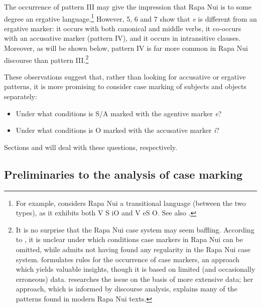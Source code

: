 The occurrence of pattern III may give the impression that Rapa Nui is to some degree an ergative language.\footnote{\label{fn:386}For example, \citet[296]{Otsuka2011} considers Rapa Nui a transitional language (between the two types), as it exhibits both V S iO and V eS O. See also \citet[182]{Mosel1997}.} However, 5, 6 and 7 show that \textit{e} is different from an ergative marker: it occurs with both canonical and middle verbs, it co\nobreakdash-occurs with an accusative marker (pattern IV), and it occurs in intransitive clauses. Moreover, as will be shown below, pattern IV is far more common in Rapa Nui discourse than pattern III.\footnote{\label{fn:387}It is no surprise that the Rapa Nui case system may seem baffling. According to \citet[575]{Clark1973}, it is unclear under which conditions case markers in Rapa Nui can be omitted, while \citet[168]{Chapin1978} admits not having found any regularity in the Rapa Nui case system. \citet{Alexander1981OL,Alexander1981Minnesota} formulates rules for the occurrence of case markers, an approach which yields valuable insights, though it is based on limited (and occasionally erroneous) data. \citet{WeberN1988,WeberN2003} researches the issue on the basis of more extensive data; her approach, which is informed by discourse analysis, explains many of the patterns found in modern Rapa Nui texts.}

These observations suggest that, rather than looking for accusative or ergative patterns, it is more promising to consider case marking of subjects and objects separately: 

\begin{itemize}
\item 
Under what conditions is S/A marked with the agentive marker \textit{e}?

\item 
Under what conditions is O marked with the accusative marker \textit{i}? 

\end{itemize}

Sections  and  will deal with these questions, respectively. 

\subsection{Preliminaries to the analysis of case marking} \label{sec:8.2.3}

